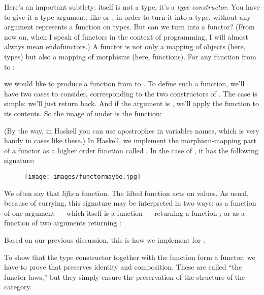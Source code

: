 Here's an important subtlety:  itself is not a type, it's
a \emph{type constructor}. You have to give it a type argument, like
 or , in order to turn it into a type.
 without any argument represents a function on types. But
can we turn  into a functor? (From now on, when I speak of
functors in the context of programming, I will almost always mean
endofunctors.) A functor is not only a mapping of objects (here, types)
but also a mapping of morphisms (here, functions). For any function from
 to :

we would like to produce a function from  to
. To define such a function, we'll have two cases to
consider, corresponding to the two constructors of . The
 case is simple: we'll just return 
back. And if the argument is , we'll apply the function
 to its contents. So the image of  under
 is the function:

(By the way, in Haskell you can use apostrophes in variables names,
which is very handy in cases like these.) In Haskell, we implement the
morphism-mapping part of a functor as a higher order function called
. In the case of , it has the following
signature:


\begin{figure}[H]
\centering
\texttt{[image: images/functormaybe.jpg]}
\end{figure}

\noindent
We often say
that  \emph{lifts} a function. The lifted function acts on
 values. As usual, because of currying, this signature may
be interpreted in two ways: as a function of one argument --- which
itself is a function  --- returning a
function ; or as a
function of two arguments returning :

Based on our previous discussion, this is how we implement 
for :

To show that the type constructor  together with the
function  form a functor, we have to prove that
 preserves identity and composition. These are called ``the
functor laws,'' but they simply ensure the preservation of the structure
of the category.

